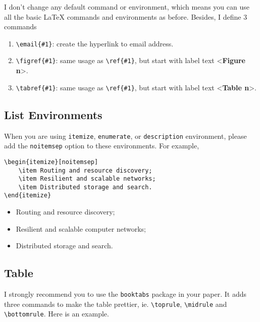 \documentclass{elegantpaper}
\begin{document}
I don't change any default command or environment, which means you can use all the basic \LaTeX{} commands and environments as before.  Besides, I define 3 commands
\begin{enumerate}[noitemsep]
	\item \verb|\email{#1}|: create the hyperlink to email address.
	\item \verb|\figref{#1}|: same usage as \verb|\ref{#1}|, but start with label text <\textbf{Figure n}>.
	\item \verb|\tabref{#1}|: same usage as \verb|\ref{#1}|, but start with label text <\textbf{Table n}>.
\end{enumerate}{}

\subsection{List Environments}
When you are using \verb|itemize|, \verb|enumerate|, or \verb|description| environment, please add the \verb|noitemsep| option to these environments. For example, \\

\begin{minipage}[c]{0.45\linewidth}
\begin{Verbatim}[tabsize=4,frame=single,baselinestretch=1]
\begin{itemize}[noitemsep]
	\item Routing and resource discovery;
	\item Resilient and scalable networks;
	\item Distributed storage and search.
\end{itemize}
\end{Verbatim}
\end{minipage}
\begin{minipage}[c]{0.45\linewidth}
\begin{itemize}[noitemsep]
	\item Routing and resource discovery;
	\item Resilient and scalable computer networks;
	\item Distributed storage and search.
\end{itemize}
\end{minipage}

\subsection{Table}
I strongly recommend you to use the \verb|booktabs| package in your paper. It adds three commands to make the table prettier, ie. \verb|\toprule|, \verb|\midrule| and \verb|\bottomrule|. Here is an example.
\end{document}

